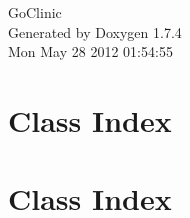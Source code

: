 \documentclass[a4paper]{book}
\begin{document}
\hypersetup{pageanchor=false}
\begin{titlepage}
\vspace*{7cm}
\begin{center}
{\Large GoClinic }\\
\vspace*{1cm}
{\large Generated by Doxygen 1.7.4}\\
\vspace*{0.5cm}
{\small Mon May 28 2012 01:54:55}\\
\end{center}
\end{titlepage}
\clearemptydoublepage
{}
\tableofcontents
\clearemptydoublepage
{}
\hypersetup{pageanchor=true}
\chapter{Class Index}

\chapter{Class Index}

\end{document}
